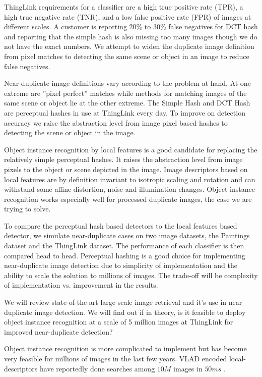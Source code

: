 \documentclass[english,12pt,a4paper,pdftex,elec,utf8, table]{aaltothesis}
\begin{document}
ThingLink requirements for a classifier are a high true positive rate (TPR), a high true negative rate (TNR), and a low false positive rate (FPR) of images at different scales. A customer is reporting 20\% to 30\% false negatives for DCT hash and reporting that the simple hash is also missing too many images though we do not have the exact numbers. We attempt to widen the duplicate image definition from pixel matches to detecting the same scene or object in an image to reduce false negatives.

Near-duplicate image definitions vary according to the problem at hand. At one extreme are ''pixel perfect'' matches while methods for matching images of the same scene or object lie at the other extreme. The Simple Hash and DCT Hash are perceptual hashes in use at ThingLink every day. To improve on detection accuracy we raise the abstraction level from image pixel based hashes to detecting the scene or object in the image.

Object instance recognition by local features is a good candidate for replacing the relatively simple perceptual hashes. It raises the abstraction level from image pixels to the object or scene depicted in the image. Image descriptors based on local features are by definition invariant to isotropic scaling and rotation and can withstand some affine distortion, noise and illumination changes. Object instance recognition works especially well for processed duplicate images, the case we are trying to solve.

To compare the perceptual hash based detectors to the local features based detector, we simulate near-duplicate cases on two image datasets, the Paintings dataset and the ThingLink dataset. The performance of each classifier is then compared head to head. Perceptual hashing is a good choice for implementing near-duplicate image detection due to simplicity of implementation and the ability to scale the solution to millions of images. The trade-off will be complexity of implementation vs. improvement in the results.

We will review state-of-the-art large scale image retrieval and it's use in near duplicate image detection. We will find out if in theory, is it feasible to deploy object instance recognition at a scale of 5 million images at ThingLink for improved near-duplicate detection?

Object instance recognition is more complicated to implement but has become very feasible for millions of images in the last few years. VLAD encoded local-descriptors have reportedly done searches among $10M$ images in $50ms$ \cite{Jegou2010}.
\end{document}
